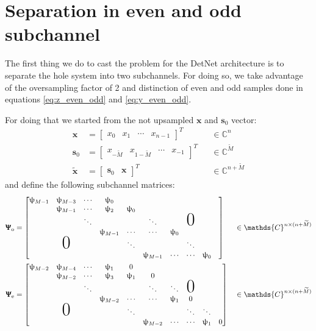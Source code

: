 \section{Separation in even and odd subchannel}

The first thing we do to cast the problem for the DetNet architecture is to separate the hole system into two subchannels. For doing so, we take advantage of the oversampling factor of 2 and distinction of even and odd samples done in equations \ref{eq:z_even_odd} and \ref{eq:y_even_odd}.

For doing that we started from the not upsampled $\bm x$ and $\bm s_0$ vector: 
\begin{align}
	\bm x &= \begin{bmatrix}x_0&x_1&\cdots& x_{n-1}\end{bmatrix}^T && \in \mathds{C}^{n}\\
	\bm{s}_0&=\begin{bmatrix}x_{-\widetilde{M}}&x_{1-\widetilde{M}}&\cdots&x_{-1}\end{bmatrix}^T && \in\mathds{C}^{\widetilde{M}}\\
	\bm \tilde{x} &= \begin{bmatrix}\bm s_0&\bm x\end{bmatrix}^T&&\in\mathds{C}^{n+\widetilde{M}}
\end{align}
and define the following subchannel matrices:
\begin{align}
	\bm \Uppsi_\text{o} &= \begin{bmatrix}
				\uppsi_{M-1}&\uppsi_{M-3}&\cdots &\uppsi_0&&&\\
				&\uppsi_{M-1}&\cdots &\uppsi_2&\uppsi_0&&\\
				&&\ddots&&&\ddots&&\mbox{\Huge 0}&\\
				&&&\uppsi_{M-1}&\cdots&\cdots&\uppsi_0&\\
				&\mbox{\Huge 0}&&&\ddots&&&\ddots&&\\
				&&&&&\uppsi_{M-1}&\cdots&\cdots&\uppsi_0&\\
			     \end{bmatrix}&&\in \mathds{C}^{n\times(n+\widetilde{M})}\\
	\bm \Uppsi_\text{e} &= \begin{bmatrix}
				\uppsi_{M-2}&\uppsi_{M-4}&\cdots &\uppsi_1&0&&\\
				&\uppsi_{M-2}&\cdots &\uppsi_3&\uppsi_1&0&\\
				&&\ddots&&&\ddots&\ddots&\mbox{\Huge 0}&\\
				&&&\uppsi_{M-2}&\cdots&\cdots&\uppsi_1&0\\
				&\mbox{\Huge 0}&&&\ddots&&&\ddots&\ddots&\\
				&&&&&\uppsi_{M-2}&\cdots&\cdots&\uppsi_1&0\\
			     \end{bmatrix}&&\in \mathds{C}^{n\times(n+\widetilde{M})}
\end{align}
